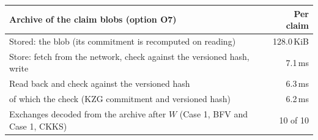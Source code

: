 \begin{tabular}{lr}
\toprule
Archive of the claim blobs (option O7) & Per claim \\
\midrule
Stored: the blob (its commitment is recomputed on reading) & 128.0\,KiB \\
Store: fetch from the network, check against the versioned hash, write & 7.1\,ms \\
Read back and check against the versioned hash & 6.3\,ms \\
\quad of which the check (KZG commitment and versioned hash) & 6.2\,ms \\
Exchanges decoded from the archive after $W$ (Case 1, BFV and Case 1, CKKS) & 10 of 10 \\
\bottomrule
\end{tabular}
